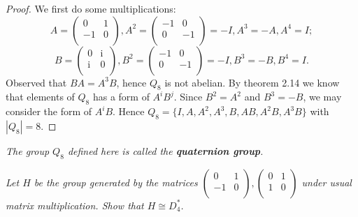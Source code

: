 \begin{proof}
We first do some multiplications:
$$
A=\left( \begin{matrix}
	0&		1\\
	-1&		0\\
\end{matrix} \right) ,A^2=\left( \begin{matrix}
	-1&		0\\
	0&		-1\\
\end{matrix} \right) =-I,A^3=-A,A^4=I;
$$
$$
B=\left( \begin{matrix}
	0&		\mathrm{i}\\
	\mathrm{i}&		0\\
\end{matrix} \right) ,B^2=\left( \begin{matrix}
	-1&		0\\
	0&		-1\\
\end{matrix} \right) =-I,B^3=-B,B^4=I.
$$
Observed that $BA=A^3B$, hence $Q_8$ is not abelian. By theorem 2.14 we know that elements of $Q_8$ has a form of $A^iB^j$. Since $B^2=A^2$ and $B^3=-B$, we may consider the form of $A^iB$. Hence $Q_8=\{I,A,A^2,A^3,B,AB,A^2B,A^3B\}$ with $|Q_8|=8$.
\end{proof}
\begin{note}\em
The group $Q_8$ defined here is called the \textbf{quaternion group}.
\end{note}
\begin{problem}\em
Let $H$ be the group generated by the matrices $
\left( \begin{matrix}
	0&		1\\
	-1&		0\\
\end{matrix} \right) ,\left( \begin{matrix}
	0&		1\\
	1&		0\\
\end{matrix} \right) 
$ under usual  matrix multiplication. Show that $H\cong D_4^*$.
\end{problem}
